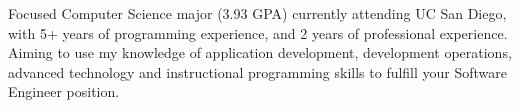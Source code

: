 
\begin{cvparagraph}
Focused Computer Science major (3.93 GPA) currently attending UC San Diego, with
5+ years of programming experience, and 2 years of professional experience.
Aiming to use my knowledge of application development, development operations,
advanced technology and instructional programming skills to fulfill your Software
Engineer position.
\end{cvparagraph}
